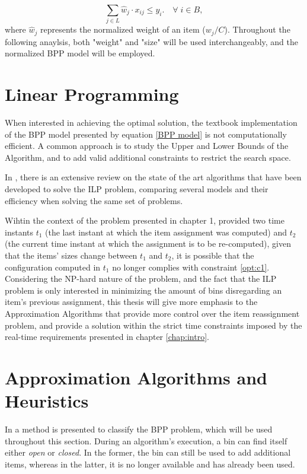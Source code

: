 \begin{equation}
    \sum_{j \in L} \hat w_j \cdot x_{ij} \leq y_i. \quad \forall \; i \in B,
\end{equation}
where \(\hat w_j\) represents the normalized weight of an item ($w_j/C$).
Throughout the following anaylsis, both "weight" and "size" will be used
interchangeably, and the normalized BPP model will be employed.

\section{Linear Programming}

When interested in achieving the optimal solution, the textbook implementation
of the BPP model presented by equation \ref{BPP model} is not computationally
efficient. A common approach is to study the Upper and Lower Bounds of the
Algorithm, and to add valid additional constraints to restrict the search space.

In \cite{delorme2016bin}, there is an extensive review on the state of the art
algorithms that have been developed to solve the ILP problem, comparing several
models and their efficiency when solving the same set of problems. 

Wihtin the context of the problem presented in chapter 1, provided two time
instants $t_1$ (the last instant at which the item assignment was computed) and
$t_2$ (the current time instant at which the assignment is to be re-computed),
given that the items' sizes change between $t_1$ and $t_2$, it is possible that
the configuration computed in $t_1$ no longer complies with constraint
\ref{opt:c1}. Considering the NP-hard nature of the problem, and the fact that the
ILP problem is only interested in minimizing the amount of bins disregarding an
item's previous assignment, this thesis will give more emphasis to the
Approximation Algorithms that provide more control over the item reassignment
problem, and provide a solution within the strict time constraints imposed by
the real-time requirements presented in chapter \ref{chap:intro}.

\section{Approximation Algorithms and Heuristics}
\label{section:AA}

In \cite{coffman2013bin} a method is presented to classify the BPP problem,
which will be used throughout this section. During an algorithm's execution,
a bin can find itself either \textit{open} or \textit{closed}. In the former,
the bin can still be used to add additional items, whereas in the latter, it is
no longer available and has already been used.  

